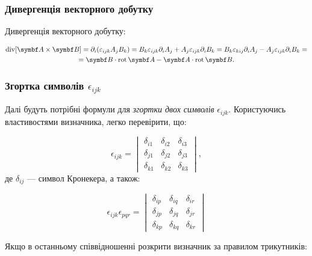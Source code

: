 \subsubsection{Дивергенція векторного добутку}

Дивергенція векторного добутку:

\begin{multline*}
\Div[\vect{A} \times \Bfield] = \partial_i (\epsilon_{ijk} A_j B_k) = B_k \epsilon_{ijk} \partial_i A_j + A_j \epsilon_{ijk} \partial_i B_k =
B_k \epsilon_{kij} \partial_i A_j - A_j \epsilon_{ijk} \partial_i B_k = \\ = \Bfield \cdot \Rot \vect{A} - \vect{A} \cdot \Rot \Bfield.
\end{multline*}

\subsubsection{Згортка символів \texorpdfstring{\(\epsilon_{ijk}\)}{}}

Далі будуть потрібні формули для \emph{згортки двох символів} \(\epsilon_{ijk}\). Користуючись властивостями визначника, легко перевірити, що:

\begin{equation*}
\epsilon_{ijk} =
\begin{vmatrix}
\delta_{i1} & \delta_{i2} & \delta_{i3} \\
\delta_{j1} & \delta_{j2} & \delta_{j3} \\
\delta_{k1} & \delta_{k2} & \delta_{k3}
\end{vmatrix},
\end{equation*}
%
де \(\delta_{ij}\) --- символ Кронекера, а також:

\begin{equation*}
\epsilon_{ijk} \epsilon_{pqr} =
\begin{vmatrix}
\delta_{ip} & \delta_{iq} & \delta_{ir} \\
\delta_{jp} & \delta_{jq} & \delta_{jr} \\
\delta_{kp} & \delta_{kq} & \delta_{kr}
\end{vmatrix}
\end{equation*}

Якщо в останньому співвідношенні розкрити визначник за правилом трикутників:

